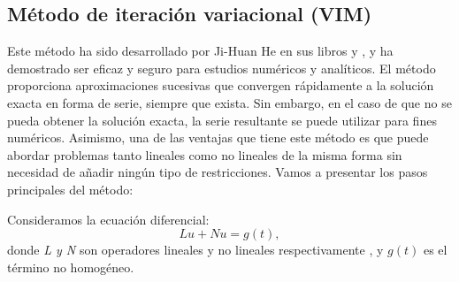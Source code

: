 \subsection{Método de iteración variacional (VIM)}
Este método ha sido desarrollado por Ji-Huan He en sus libros \cite{VIM1} y \cite{VIM2}, y ha demostrado ser eficaz y seguro para estudios numéricos y analíticos. El método proporciona aproximaciones sucesivas que convergen rápidamente a la solución exacta en forma de serie, siempre que exista. Sin embargo, en el caso de que no se pueda obtener la solución exacta, la serie resultante se puede utilizar para fines numéricos. Asimismo, una de las ventajas que tiene este método es que puede abordar problemas tanto lineales como no lineales de la misma forma sin necesidad de añadir ningún tipo de restricciones. Vamos a presentar los pasos principales del método:

Consideramos la ecuación diferencial:
\begin{equation}\label{eq:miv1}
	Lu + Nu = g(t),
\end{equation}
donde \textit{L y N} son operadores lineales y no lineales respectivamente , y $g(t)$ es el término no homogéneo.

